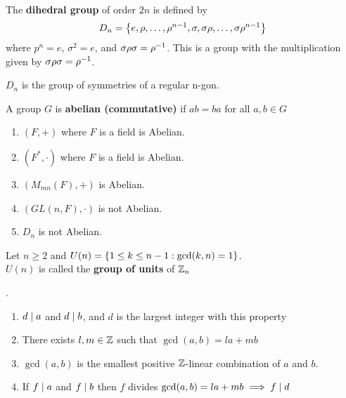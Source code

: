 \begin{definition}
    The \textbf{dihedral group} of order $2n$ is defined by $$D_n = \left\{e, \rho, \dots, \rho^{n-1}, \sigma, \sigma\rho, \dots, \sigma\rho^{n - 1}\right\}$$ where $p^n = e$, $\sigma^2 = e$, and $\sigma\rho\sigma = \rho^{-1}$.
    This is a group with the multiplication given by $\sigma\rho\sigma = \rho^{-1}$.
\end{definition}

\begin{remark}
    $D_n$ is the group of symmetries of a regular n-gon.
\end{remark}

\begin{definition}
    A group $G$ is \textbf{abelian (commutative)} if $ab=ba$ for all $a, b \in G$
\end{definition}

\begin{example}
    \spacebeforelist
    \begin{enumerate}
        \item $(F, +)$ where $F$ is a field is Abelian.
        \item $(F^*, \cdot)$ where $F$ is a field is Abelian.
        \item $(M_{mn}(F), +)$ is Abelian.
        \item $(GL(n, F), \cdot)$ is not Abelian.
        \item $D_n$ is not Abelian.
    \end{enumerate}
\end{example}

\begin{definition}
    Let $n \geq 2$ and $U(n) = \left\{1 \leq k \leq n-1: \gcd (k,n) = 1\right\}$. \\
    $U(n)$ is called the \textbf{group of units} of $\mathbb{Z}_n$
\end{definition}

\begin{recall}[Facts about $d = \gcd (a,b)$]
    .
    \begin{enumerate}
        \item $d \mid a$ and $d \mid b$, and $d$ is the largest integer with this property
        \item There exists $l, m \in \mathbb{Z}$ such that $\gcd (a,b) = la + mb$
        \item $\gcd (a,b)$ is the smallest positive $\mathbb{Z}$-linear combination of $a$ and $b$.
        \item If $f \mid a$ and $f \mid b$ then $f$ divides $\gcd (a,b) = la + mb \implies f \mid d$
    \end{enumerate}
\end{recall}

